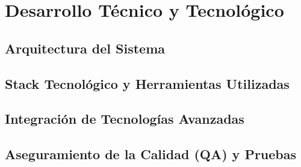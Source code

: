 \chapter{Desarrollo Técnico y Tecnológico}\label{cp:development}

\section{Arquitectura del Sistema}

\section{Stack Tecnológico y Herramientas Utilizadas}

\section{Integración de Tecnologías Avanzadas}

\section{Aseguramiento de la Calidad (QA) y Pruebas}\label{sec:qa-pruebas}
